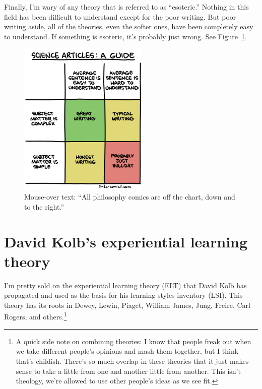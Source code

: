 \documentclass[man,natbib]{apa6}
\begin{document}
Finally, I'm wary of any theory that is referred to as ``esoteric.'' Nothing in this field has been difficult to understand except for the poor writing. But poor writing aside, all of the theories, even the softer ones, have been completely easy to understand. If something is esoteric, it's probably just wrong. See Figure~\ref{fig:science-articles-writing}.
\begin{figure}[h]
    \centering
    \includegraphics[width=0.55\textwidth]{science-articles-writing}
    \caption{Mouse-over text: ``All philosophy comics are off the chart, down and to the right.'' \citep{smbc}}
    \label{fig:science-articles-writing}
\end{figure}

\section{David Kolb's experiential learning theory}
I'm pretty sold on the experiential learning theory (ELT) that David Kolb has propagated \citep{kolb2005kolb} and used as the basis for his learning styles inventory (LSI). This theory has its roots in Dewey, Lewin, Piaget, William James, Jung, Freire, Carl Rogers, and others.\footnote{A quick side note on combining theories: I know that people freak out when we take different people's opinions and mash them together, but I think that's childish. There's so much overlap in these theories that it just makes sense to take a little from one and another little from another. This isn't theology, we're allowed to use other people's ideas as we see fit.}
\end{document}
